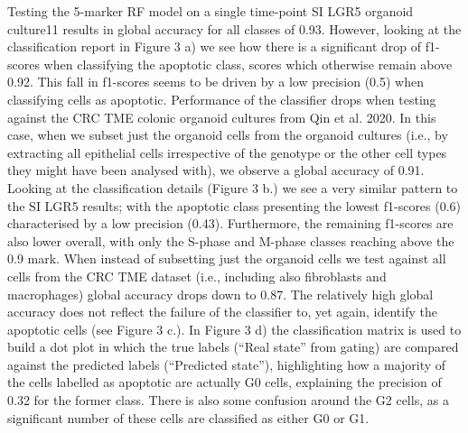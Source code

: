 Testing the 5-marker RF model on a single time-point SI LGR5 organoid culture11 results in global accuracy for all classes of 0.93. However, looking at the classification report in Figure 3 a) we see how there is a significant drop of f1-scores when classifying the apoptotic class, scores which otherwise remain above 0.92. This fall in f1-scores seems to be driven by a low precision (0.5) when classifying cells as apoptotic.
Performance of the classifier drops when testing against the CRC TME colonic organoid cultures from Qin et al. 2020. In this case, when we subset just the organoid cells from the organoid cultures (i.e., by extracting all epithelial cells irrespective of the genotype or the other cell types they might have been analysed with), we observe a global accuracy of 0.91. Looking at the classification details (Figure 3 b.) we see a very similar pattern to the SI LGR5 results; with the apoptotic class presenting the lowest f1-scores (0.6) characterised by a low precision (0.43). Furthermore, the remaining f1-scores are also lower overall, with only the S-phase and M-phase classes reaching above the 0.9 mark.
When instead of subsetting just the organoid cells we test against all cells from the CRC TME dataset (i.e., including also fibroblasts and macrophages) global accuracy drops down to 0.87. The relatively high global accuracy does not reflect the failure of the classifier to, yet again, identify the apoptotic cells (see Figure 3 c.). In Figure 3 d) the classification matrix is used to build a dot plot in which the true labels (“Real state” from gating) are compared against the predicted labels (“Predicted state”), highlighting how a majority of the cells labelled as apoptotic are actually G0 cells, explaining the precision of 0.32 for the former class. There is also some confusion around the G2 cells, as a significant number of these cells are classified as either G0 or G1.
 
